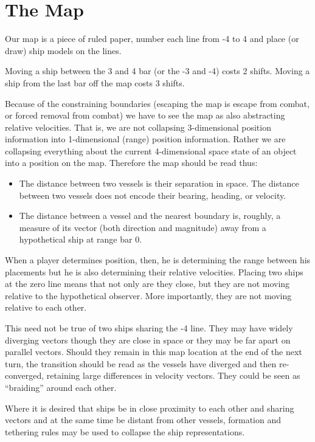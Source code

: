 \section{The Map}\label{sec:The Map} %

Our map is a piece of ruled paper, number each line from -4 to 4 and place (or draw) ship models on the lines.

Moving a ship between the 3 and 4 bar (or the -3 and -4) costs 2 shifts. Moving a ship from the last bar off the map costs 3 shifts.

Because of the constraining boundaries (escaping the map is escape from combat, or forced removal from combat) we have to see the map as also abstracting relative velocities. That is, we are not collapsing 3-dimensional position information into 1-dimensional (range) position information. Rather we are collapsing everything about the current 4-dimensional space state of an object into a position on the map. Therefore the map should be read thus:

\begin{itemize}
\item The distance between two vessels is their separation in space. The distance between two vessels does not encode their bearing, heading, or velocity.
\item The distance between a vessel and the nearest boundary is, roughly, a measure of its vector (both direction and magnitude) away from a hypothetical ship at range bar 0.
\end{itemize}

When a player determines position, then, he is determining the range between his placements but he is also determining their relative velocities. Placing two ships at the zero line means that not only are they close, but they are not moving relative to the hypothetical observer. More importantly, they are not moving relative to each other.

This need not be true of two ships sharing the -4 line. They may have widely diverging vectors though they are close in space or they may be far apart on parallel vectors. Should they remain in this map location at the end of the next turn, the transition should be read as the vessels have diverged and then re-converged, retaining large differences in velocity vectors. They could be seen as ``braiding'' around each other.

Where it is desired that ships be in close proximity to each other and sharing vectors and at the same time be distant from other vessels, formation and tethering rules may be used to collapse the ship representations.

